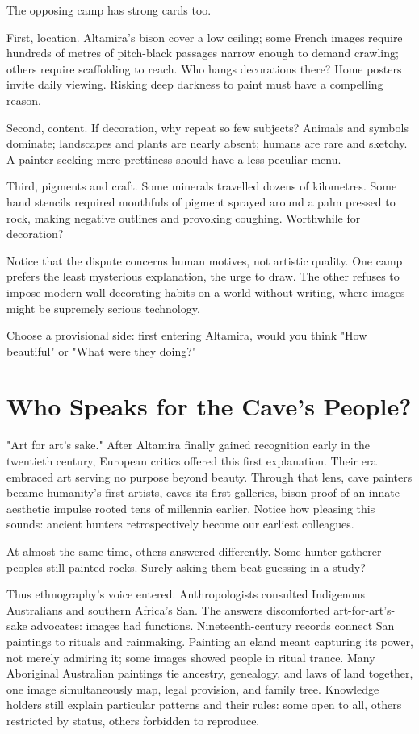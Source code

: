 The opposing camp has strong cards too.

First, location. Altamira's bison cover a low ceiling; some French images require hundreds of metres of pitch-black passages narrow enough to demand crawling; others require scaffolding to reach. Who hangs decorations there? Home posters invite daily viewing. Risking deep darkness to paint must have a compelling reason.

Second, content. If decoration, why repeat so few subjects? Animals and symbols dominate; landscapes and plants are nearly absent; humans are rare and sketchy. A painter seeking mere prettiness should have a less peculiar menu.

Third, pigments and craft. Some minerals travelled dozens of kilometres. Some hand stencils required mouthfuls of pigment sprayed around a palm pressed to rock, making negative outlines and provoking coughing. Worthwhile for decoration?

Notice that the dispute concerns human motives, not artistic quality. One camp prefers the least mysterious explanation, the urge to draw. The other refuses to impose modern wall-decorating habits on a world without writing, where images might be supremely serious technology.

Choose a provisional side: first entering Altamira, would you think "How beautiful" or "What were they doing?"

\section{Who Speaks for the Cave's People?}
"Art for art's sake." After Altamira finally gained recognition early in the twentieth century, European critics offered this first explanation. Their era embraced art serving no purpose beyond beauty. Through that lens, cave painters became humanity's first artists, caves its first galleries, bison proof of an innate aesthetic impulse rooted tens of millennia earlier. Notice how pleasing this sounds: ancient hunters retrospectively become our earliest colleagues.

At almost the same time, others answered differently. Some hunter-gatherer peoples still painted rocks. Surely asking them beat guessing in a study?

Thus ethnography's voice entered. Anthropologists consulted Indigenous Australians and southern Africa's San. The answers discomforted art-for-art's-sake advocates: images had functions. Nineteenth-century records connect San paintings to rituals and rainmaking. Painting an eland meant capturing its power, not merely admiring it; some images showed people in ritual trance. Many Aboriginal Australian paintings tie ancestry, genealogy, and laws of land together, one image simultaneously map, legal provision, and family tree. Knowledge holders still explain particular patterns and their rules: some open to all, others restricted by status, others forbidden to reproduce.

